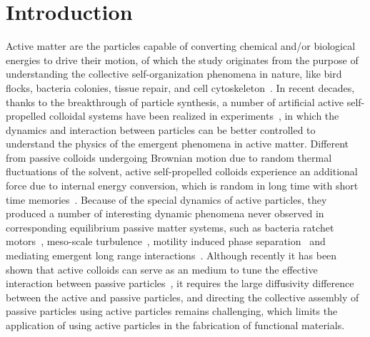 \documentclass[prl, twocolumn, showpacs, preprintnumbers,amsmath,amssymb]{revtex4-1}
\begin{document}
\section{Introduction}
Active matter are the particles capable of converting chemical and/or biological energies to drive their motion, of which the study originates from the purpose of understanding the collective self-organization phenomena in nature, like bird flocks, bacteria colonies, tissue repair, and cell cytoskeleton~\cite{revscience2012}. In recent decades, thanks to the breakthrough of particle synthesis, a number of artificial active self-propelled colloidal systems have been realized in experiments~\cite{dreyfus2005,howse2007,erbe2008,palacci2010,baraban2012,volpe2011,palacci2013,wilson2012}, 
in which the dynamics and interaction between particles can be better controlled to understand the physics of the emergent phenomena in active matter. Different from passive colloids undergoing Brownian motion due to random thermal fluctuations of the solvent, active self-propelled colloids experience an additional force due to internal energy conversion, which is random in long time with short time memories~\cite{lowen2011}.
Because of the special dynamics of active particles, they produced a number of interesting dynamic phenomena never observed in corresponding equilibrium passive matter systems, such as bacteria ratchet motors~\cite{leonado2010}, meso-scale turbulence~\cite{wensink2012}, motility induced phase separation~\cite{fily2012,redner2013,cates2013prl,speck2013,fily2014,gompper2014,cates2014theory,lowen2013,
speck2014e,bradyprl2014} and mediating emergent long range interactions~\cite{niprl2015,ray2014}. Although recently it has been shown that active colloids can serve as an medium to tune the effective interaction between passive particles~\cite{niprl2015,ray2014}, it requires the large diffusivity difference between the active and passive particles, and directing the collective assembly of passive particles using active particles remains challenging, which limits the application of using active particles in the fabrication of functional materials. 
\end{document}
